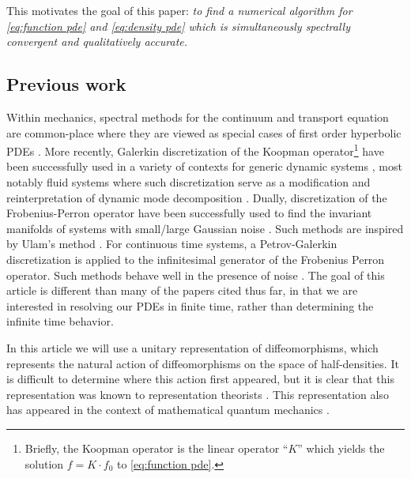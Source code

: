 \documentclass[final,leqno]{siamltex1213}
\begin{document}
This motivates the goal of this paper:
\emph{to find a numerical algorithm for \eqref{eq:function pde} and \eqref{eq:density pde} which is simultaneously spectrally convergent and qualitatively accurate.}

\subsection{Previous work}
Within mechanics, spectral methods for the continuum and transport equation are common-place
where they are viewed as special cases of first order hyperbolic PDEs \cite{Boyd2001,Gottlieb2001}.
More recently, Galerkin discretization of the Koopman operator\footnote{Briefly, the Koopman operator is the linear operator ``$K$'' which yields the solution $f = K \cdot f_{0}$ to \eqref{eq:function pde}.} have been successfully used
in a variety of contexts for generic dynamic systems \cite{BudisicMohrMezic2012,Mezic2005}, most notably fluid systems \cite{Rowley2009} where such discretization serve as a modification and reinterpretation of dynamic mode decomposition \cite{Schmid2010}.
Dually, discretization of the Frobenius-Perron operator have been successfully used to find the invariant manifolds of systems with small/large Gaussian noise \cite{FroylandJungeKoltai2013,FroylandPadberg2009}.
Such methods are inspired by Ulam's method \cite{Ulam1947,LasotaMackey1994}.
For continuous time systems, a Petrov-Galerkin discretization is applied to the infinitesimal generator of the Frobenius Perron operator.
Such methods behave well in the presence of noise \cite{BittracherKoltaiJunge2015}.
The goal of this article is different than many of the papers cited thus far, in that we are interested in resolving our PDEs in finite time, rather than determining the infinite time behavior.

In this article we will use a unitary representation of diffeomorphisms, which represents the natural action of diffeomorphisms on the space of half-densities.
It is difficult to determine where this action first appeared, but it is clear that this representation was known to representation theorists \cite{VershilGelfandGraev1975,Ismagilov1975}.
This representation also has appeared in the context of mathematical quantum mechanics \cite{Meyer1998,Parthasarathy2012}.
\end{document}
